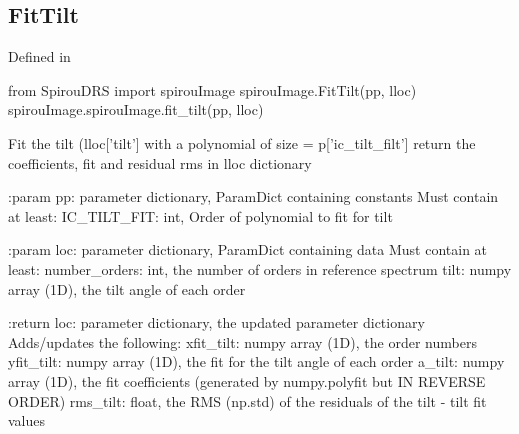 \noindent\begin{minipage}{\textwidth}
\subsection{FitTilt}

Defined in \spirouImage{}

\begin{pythonbox}
from SpirouDRS import spirouImage
spirouImage.FitTilt(pp, lloc)
spirouImage.spirouImage.fit_tilt(pp, lloc)
\end{pythonbox}

\begin{pythondocstring}
Fit the tilt (lloc['tilt'] with a polynomial of size = p['ic_tilt_filt']
return the coefficients, fit and residual rms in lloc dictionary

:param pp: parameter dictionary, ParamDict containing constants
    Must contain at least:
        IC_TILT_FIT: int, Order of polynomial to fit for tilt

:param loc: parameter dictionary, ParamDict containing data
        Must contain at least:
            number_orders: int, the number of orders in reference spectrum
            tilt: numpy array (1D), the tilt angle of each order

:return loc: parameter dictionary, the updated parameter dictionary
        Adds/updates the following:
            xfit_tilt: numpy array (1D), the order numbers
            yfit_tilt: numpy array (1D), the fit for the tilt angle of each
                       order
            a_tilt: numpy array (1D), the fit coefficients (generated by
                    numpy.polyfit but IN REVERSE ORDER)
            rms_tilt: float, the RMS (np.std) of the residuals of the
                      tilt - tilt fit values
\end{pythondocstring}
\end{minipage}


